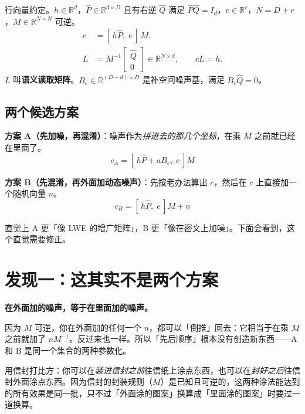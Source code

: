 \documentclass[UTF8, fontset=macnew, 11pt]{ctexart}
\newcommand{\Ph}{\hat P}
\newcommand{\Qh}{\hat Q}
\begin{document}
\begin{mathbox}
行向量约定。$h\in\mathbb R^{d}$，$\Ph\in\mathbb R^{d\times D}$ 且有右逆 $\Qh$ 满足 $\Ph\Qh=I_d$，$e\in\mathbb R^{r}$，$N=D+r$，$M\in\mathbb R^{N\times N}$ 可逆。
\begin{align}
c &= [\,h\Ph,\;e\,]\,M, \label{eq:enc}\\
L &= M^{-1}\begin{bmatrix}\Qh\\0\end{bmatrix}\in\mathbb R^{N\times d},
\qquad cL = h. \label{eq:dec}
\end{align}
$L$ 叫\textbf{语义读取矩阵}。$B_c\in\mathbb R^{(D-d)\times D}$ 是补空间噪声基，满足 $B_c\Qh=0$。
\end{mathbox}

\subsection{两个候选方案}

\begin{plainbox}[两条路线]
\textbf{方案 A（先加噪，再混淆）}：噪声作为\emph{拼进去的那几个坐标}，在乘 $M$ 之前就已经在里面了。
$$c_A=[\,h\Ph+aB_c,\;e\,]M$$

\textbf{方案 B（先混淆，再外面加动态噪声）}：先按老办法算出 $c$，然后在 $c$ 上直接加一个随机向量 $n$。
$$c_B=[\,h\Ph,\;e\,]M+n$$

直觉上 A 更「像 LWE 的增广矩阵」，B 更「像在密文上加噪」。下面会看到，这个直觉需要修正。
\end{plainbox}

\section{发现一：这其实不是两个方案}

\begin{plainbox}
\textbf{在外面加的噪声，等于在里面加的噪声。}

因为 $M$ 可逆，你在外面加的任何一个 $n$，都可以「倒推」回去：它相当于在乘 $M$ 之前就加了 $nM^{-1}$。反过来也一样。所以「先后顺序」根本没有创造新东西——A 和 B 是同一个集合的两种参数化。

用信封打比方：你可以在\emph{装进信封之前}往信纸上涂点东西，也可以在\emph{封好之后}往信封外面涂点东西。因为信封的封装规则（$M$）是已知且可逆的，这两种涂法能达到的所有效果是同一批，只不过「外面涂的图案」换算成「里面涂的图案」时要过一道换算。
\end{plainbox}
\end{document}
